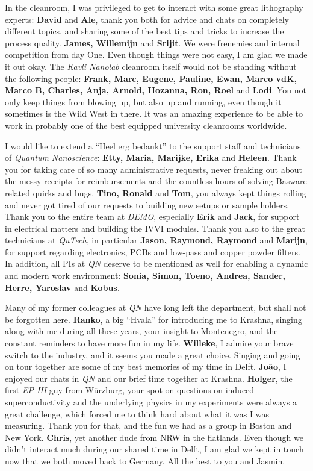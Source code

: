 In the cleanroom, I was privileged to get to interact with some great lithography experts:
%
\textbf{David} and \textbf{Ale}, thank you both for advice and chats on completely different topics, and sharing some of the best tips and tricks to increase the process quality.
%
\textbf{James, Willemijn} and \textbf{Srijit}.
%
We were frenemies and internal competition from day One.
%
Even though things were not easy, I am glad we made it out okay.
%
The \textit{Kavli Nanolab} cleanroom itself would not be standing without the following people:
%
\textbf{Frank, Marc, Eugene, Pauline, Ewan, Marco vdK, Marco B, Charles, Anja, Arnold, Hozanna, Ron, Roel} and \textbf{Lodi}.
%
You not only keep things from blowing up, but also up and running, even though it sometimes is the Wild West in there.
%
It was an amazing experience to be able to work in probably one of the best equipped university cleanrooms worldwide.

I would like to extend a \enquote{Heel erg bedankt} to the support staff and technicians of \textit{Quantum Nanoscience}:
%
\textbf{Etty, Maria, Marijke, Erika} and \textbf{Heleen}.
%
Thank you for taking care of so many administrative requests, never freaking out about the messy receipts for reimbursements and the countless hours of solving Basware related quirks and bugs.
%
\textbf{Tino, Ronald} and \textbf{Tom}, you always kept things rolling and never got tired of our requests to building new setups or sample holders.
%
Thank you to the entire team at \textit{DEMO}, especially \textbf{Erik} and \textbf{Jack}, for support in electrical matters and building the IVVI modules.
%
Thank you also to the great technicians at \textit{QuTech}, in particular \textbf{Jason, Raymond, Raymond} and \textbf{Marijn}, for support regarding electronics, PCBs and low-pass and copper powder filters.
%
In addition, all PIs at \textit{QN} deserve to be mentioned as well for enabling a dynamic and modern work environment:
%
\textbf{Sonia, Simon, Toeno, Andrea, Sander, Herre, Yaroslav} and \textbf{Kobus}.
	
Many of my former colleagues at \textit{QN} have long left the department, but shall not be forgotten here.
%
\textbf{Ranko}, a big \enquote{Hvala} for introducing me to Krashna, singing along with me during all these years, your insight to Montenegro, and the constant reminders to have more fun in my life.
%
\textbf{Willeke}, I admire your brave switch to the industry, and it seems you made a great choice.
%
Singing and going on tour together are some of my best memories of my time in Delft. 
%
\textbf{João}, I enjoyed our chats in \textit{QN} and our brief time together at Krashna.
%
\textbf{Holger}, the first \textit{EP III} guy from Würzburg, your spot-on questions on induced superconductivity and the underlying physics in my experiments were always a great challenge, which forced me to think hard about what it was I was measuring.
%
Thank you for that, and the fun we had as a group in Boston and New York.
%
\textbf{Chris}, yet another dude from NRW in the flatlands.
%
Even though we didn't interact much during our shared time in Delft, I am glad we kept in touch now that we both moved back to Germany.
%
All the best to you and Jasmin.

